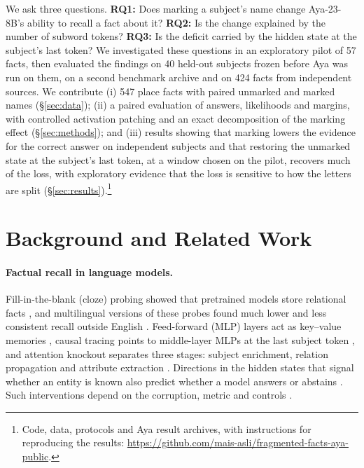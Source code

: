 \documentclass[11pt]{article}
\begin{document}
We ask three questions. \textbf{RQ1:} Does marking a subject's name change
Aya-23-8B's ability to recall a fact about it? \textbf{RQ2:} Is the change
explained by the number of subword tokens? \textbf{RQ3:} Is the deficit carried
by the hidden state at the subject's last token? We investigated these questions in an exploratory pilot of 57 facts,
then evaluated the findings on 40 held-out subjects frozen before Aya was run on
them, on a second benchmark archive and on 424 facts from independent
sources. We contribute (i) 547 place facts with paired unmarked and
marked names (\S\ref{sec:data}); (ii) a paired evaluation of answers,
likelihoods and margins, with controlled activation patching and an exact
decomposition of the marking effect (\S\ref{sec:methods}); and (iii) results showing
that marking lowers the evidence for the correct answer on independent subjects
and that restoring the unmarked state at the subject's last token, at a window
chosen on the pilot, recovers much of the loss, with exploratory evidence that
the loss is sensitive to how the letters are split
(\S\ref{sec:results}).\footnote{Code, data, protocols and Aya result archives,
with instructions for reproducing the results:
\url{https://github.com/mais-asli/fragmented-facts-aya-public}.}

\section{Background and Related Work}
\label{sec:related}

\paragraph{Factual recall in language models.}
Fill-in-the-blank (cloze) probing showed that pretrained models store relational facts
\citep{petroni-etal-2019-language}, and multilingual versions of these probes
found much lower and less consistent recall outside English
\citep{jiang-etal-2020-x,kassner-etal-2021-multilingual,qi-etal-2023-cross}.
Feed-forward (MLP) layers act as key--value memories \citep{geva-etal-2021-transformer}, causal
tracing points to middle-layer MLPs at the last subject token
\citep{meng-etal-2022-locating}, and attention knockout separates three stages:
subject enrichment, relation propagation and attribute extraction
\citep{geva-etal-2023-dissecting}. Directions in the hidden states that signal
whether an entity is known also predict whether a model answers or abstains
\citep{ferrando-etal-2025-know}. Such interventions \citep{vig-etal-2020-causal}
depend on the corruption, metric and controls
\citep{zhang-nanda-2024-best,heimersheim-nanda-2024-patching}.
\end{document}
